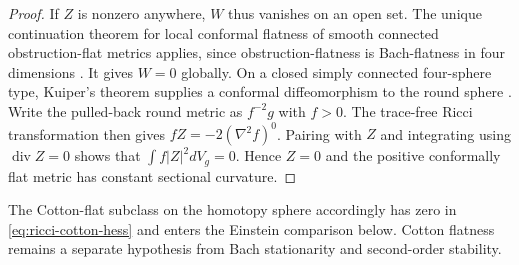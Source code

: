 \begin{proof}
If \(Z\) is nonzero anywhere, \(W\) thus vanishes on an open set.
The unique continuation theorem for local conformal flatness of
smooth connected obstruction-flat metrics applies, since
obstruction-flatness is Bach-flatness in four dimensions
\cite[Theorem~3.8]{LassasLiimatainen2019ConformalHarmonic}.
It gives \(W=0\) globally. On a closed simply connected four-sphere
type, Kuiper's theorem supplies a conformal diffeomorphism to the
round sphere \cite{Kuiper1949}. Write the pulled-back round metric
as \(f^{-2}g\) with \(f>0\). The trace-free Ricci transformation
then gives \(f Z=-2(\nabla^2 f)^0\). Pairing with \(Z\) and
integrating using \(\operatorname{div}Z=0\) shows that
\(\int f|Z|^2dV_g=0\). Hence \(Z=0\) and the positive conformally
flat metric has constant sectional curvature.
\end{proof}

The Cotton-flat subclass on the homotopy sphere accordingly
has zero in \eqref{eq:ricci-cotton-hess} and enters the Einstein
comparison below. Cotton flatness remains a separate hypothesis
from Bach stationarity and second-order stability.
